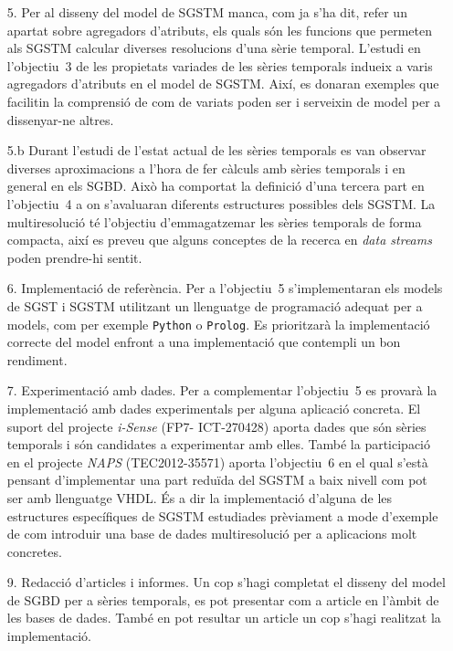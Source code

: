 \begin{itemize}

\item[5.] Per al disseny del model de SGSTM manca, com ja s'ha dit,
  refer un apartat sobre agregadors d'atributs, els quals són les
  funcions que permeten als SGSTM calcular diverses resolucions d'una
  sèrie temporal. L'estudi en l'objectiu~3 de les propietats variades
  de les sèries temporals indueix a varis agregadors d'atributs en el
  model de SGSTM. Així, es donaran exemples que facilitin la
  comprensió de com de variats poden ser i serveixin de model per a
  dissenyar-ne altres.


\item[5.b] Durant l'estudi de l'estat actual de les sèries temporals
  es van observar diverses aproximacions a l'hora de fer càlculs amb
  sèries temporals i en general en els SGBD. Això ha comportat la
  definició d'una tercera part en l'objectiu~4 a on s'avaluaran
  diferents estructures possibles dels SGSTM.  La multiresolució té
  l'objectiu d'emmagatzemar les sèries temporals de forma compacta,
  així es preveu que alguns conceptes de la recerca en \emph{data
    streams} poden prendre-hi sentit.



\item[6.] Implementació de referència. Per a l'objectiu~5 s'implementaran
  els models de SGST i SGSTM utilitzant un llenguatge de programació adequat
  per a models, com per exemple \texttt{Python} o \texttt{Prolog}.  Es
  prioritzarà la implementació correcte del model enfront a una
  implementació que contempli un bon rendiment. 


\item[7.] Experimentació amb dades. Per a complementar l'objectiu~5 es
  provarà la implementació amb dades experimentals per alguna
  aplicació concreta. El suport del projecte \emph{i-Sense} (FP7-
  ICT-270428) aporta dades que són sèries temporals i són candidates a
  experimentar amb elles.  També la participació en el projecte
  \emph{NAPS} (TEC2012-35571) aporta l'objectiu~6 en el qual s'està
  pensant d'implementar una part reduïda del SGSTM a baix nivell com
  pot ser amb llenguatge VHDL. És a dir la implementació d'alguna de
  les estructures específiques de SGSTM estudiades prèviament a mode
  d'exemple de com introduir una base de dades multiresolució per a
  aplicacions molt concretes.




\item[9.] Redacció d'articles i informes. Un cop s'hagi completat el
  disseny del model de SGBD per a sèries temporals, es pot presentar
  com a article en l'àmbit de les bases de dades.  També en pot
  resultar un article un cop s'hagi realitzat la implementació.


\end{itemize}







% 

% 






